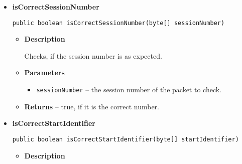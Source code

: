 {{{{{\begin{itemize}
{\begin{itemize}
{Checks, if the packet number is as expected.
}
\item{
{\bf  Parameters}
  \begin{itemize}
   \item{
\texttt{packetNumber} -- the packet number of the packet to check.}
  \end{itemize}
}%
\item{{\bf  Returns} -- 
true, if it is the correct number. 
}%
\end{itemize}
}%
\item{ 
\hypertarget{filetransferUDP.FileTransfer.isCorrectSessionNumber(byte[])}{{\bf  isCorrectSessionNumber}\\}
\begin{lstlisting}[frame=none]
public boolean isCorrectSessionNumber(byte[] sessionNumber)\end{lstlisting} %
\begin{itemize}
\item{
{\bf  Description}

Checks, if the session number is as expected.
}
\item{
{\bf  Parameters}
  \begin{itemize}
   \item{
\texttt{sessionNumber} -- the session number of the packet to check.}
  \end{itemize}
}%
\item{{\bf  Returns} -- 
true, if it is the correct number. 
}%
\end{itemize}
}%
\item{ 
\hypertarget{filetransferUDP.FileTransfer.isCorrectStartIdentifier(byte[])}{{\bf  isCorrectStartIdentifier}\\}
\begin{lstlisting}[frame=none]
public boolean isCorrectStartIdentifier(byte[] startIdentifier)\end{lstlisting} %
\begin{itemize}
\item{
{\bf  Description}

}
\end{itemize}}
\end{itemize}}}}}}
